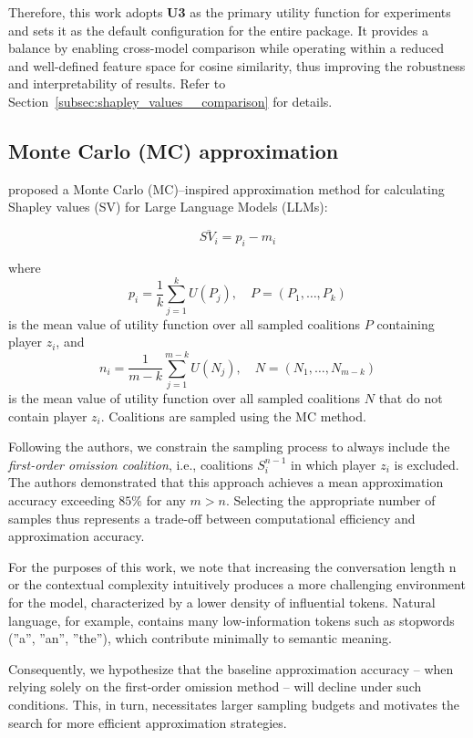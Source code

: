 Therefore, this work adopts \textbf{U3} as the primary utility function for experiments and sets it as the default configuration for the entire package. It provides a balance by enabling cross-model comparison while operating within a reduced and well-defined feature space for cosine similarity, thus improving the robustness and interpretability of results. Refer to Section~\ref{subsec:shapley_values__comparison} for details.

\subsection{Monte Carlo (MC) approximation}
\label{subsec:shapley_values__monte_carlo}

\textcite{goldshmidt2024tokenshapinterpretinglargelanguage} proposed a Monte Carlo (MC)–inspired approximation method for calculating Shapley values (SV) for Large Language Models (LLMs):

\[
\overline{SV_i} = p_i - m_i
\]

\noindent where
\[
p_i = \frac{1}{k} \sum_{j=1}^{k} U(P_j), \quad P = (P_1, \dots, P_k)
\]
is the mean value of utility function over all sampled coalitions $P$ containing player $z_i$, and
\[
n_i = \frac{1}{m - k} \sum_{j=1}^{m - k} U(N_j), \quad N = (N_1, \dots, N_{m - k})
\]
is the mean value of utility function over all sampled coalitions $N$ that do not contain player $z_i$. Coalitions are sampled using the MC method.

Following the authors, we constrain the sampling process to always include the \textit{first-order omission coalition}, i.e., coalitions $S_i^{n-1}$ in which player $z_i$ is excluded. The authors demonstrated that this approach achieves a mean approximation accuracy exceeding $85\%$ for any $m > n$. Selecting the appropriate number of samples thus represents a trade-off between computational efficiency and approximation accuracy.

For the purposes of this work, we note that increasing the conversation length n or the contextual complexity intuitively produces a more challenging environment for the model, characterized by a lower density of influential tokens. Natural language, for example, contains many low-information tokens such as stopwords (''a'', ''an'', ''the''), which contribute minimally to semantic meaning.

Consequently, we hypothesize that the baseline approximation accuracy -- when relying solely on the first-order omission method -- will decline under such conditions. This, in turn, necessitates larger sampling budgets and motivates the search for more efficient approximation strategies.

